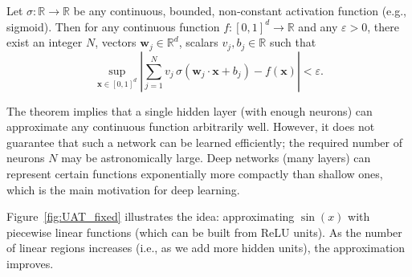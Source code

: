 \documentclass{tufte-handout}
\begin{document}
\begin{thm}[Cybenko, 1989]
    Let $\sigma: \mathbb{R}\to\mathbb{R}$ be any continuous, bounded, non‑constant activation function (e.g., sigmoid). Then for any continuous function $f: [0,1]^d \to \mathbb{R}$ and any $\varepsilon > 0$, there exist an integer $N$, vectors $\mathbf{w}_j \in \mathbb{R}^d$, scalars $v_j, b_j \in \mathbb{R}$ such that
    \[
    \sup_{\mathbf{x}\in[0,1]^d} \left| \sum_{j=1}^{N} v_j \, \sigma(\mathbf{w}_j\cdot\mathbf{x} + b_j) - f(\mathbf{x}) \right| < \varepsilon.
    \]
\end{thm}

The theorem implies that a single hidden layer (with enough neurons) can approximate any continuous function arbitrarily well. However, it does not guarantee that such a network can be learned efficiently; the required number of neurons $N$ may be astronomically large. Deep networks (many layers) can represent certain functions exponentially more compactly than shallow ones, which is the main motivation for deep learning.

Figure~\ref{fig:UAT_fixed} illustrates the idea: approximating $\sin(x)$ with piecewise linear functions (which can be built from ReLU units). As the number of linear regions increases (i.e., as we add more hidden units), the approximation improves.
\end{document}
